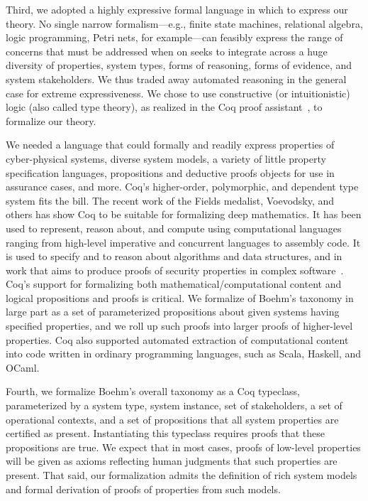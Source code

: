 \documentclass[conference]{IEEEtran}
\begin{document}
Third, we adopted a highly expressive formal language in which to express our theory. No single narrow formalism---e.g., finite state machines, relational algebra, logic programming, Petri nets, for example---can feasibly express the range of concerns that must be addressed when on seeks to integrate across a huge diversity of properties, system types, forms of reasoning, forms of evidence, and system stakeholders. We thus traded away automated reasoning in the general case for extreme expressiveness. 
We chose to use constructive (or intuitionistic) logic (also called type theory), as realized in the Coq proof assistant~\cite{coq}, to formalize our theory. 

We needed a language that could formally and readily express properties of cyber-physical systems, diverse system models, a variety of little property specification languages, propositions and deductive proofs objects for use in assurance cases, and more. Coq's higher-order, polymorphic, and dependent type system fits the bill. The recent work of the Fields medalist, Voevodsky, and others has show Coq to be suitable for formalizing deep mathematics. It has been used to represent, reason about, and compute using computational languages~\cite{pierce} ranging from high-level imperative and concurrent languages to assembly code. It is used to specify and to reason about algorithms and data structures, and in work that aims to produce proofs of security properties in complex software~\cite{}. Coq's support for formalizing both mathematical/computational content and logical propositions and proofs is critical. We formalize of Boehm's taxonomy in large part as a set of parameterized propositions about given systems having specified properties, and we roll up such proofs into larger proofs of higher-level properties. Coq also supported automated extraction of computational content into code written in ordinary programming languages, such as Scala, Haskell, and OCaml.

Fourth, we formalize Boehm's overall taxonomy as a Coq typeclass, parameterized by a system type, system instance, set of stakeholders, a set of operational contexts, and a set of propositions that all system properties are certified as present. Instantiating this typeclass requires proofs that these propositions are true. We expect that in most cases, proofs of low-level properties will be given as axioms reflecting human judgments that such properties are present. That said, our formalization admits the definition of rich system models and formal derivation of proofs of properties from such models. 
\end{document}
